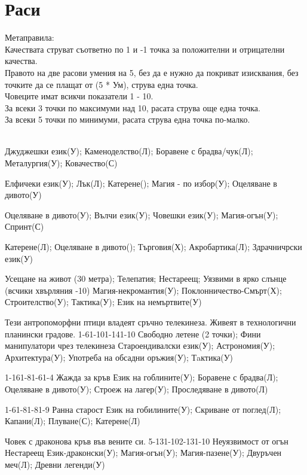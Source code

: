 \section{Раси}
Метаправила:  \\
Качествата струват съответно по 1 и -1 точка за положителни и отрицателни качества.  \\
Правото на две расови умения на 5, без да е нужно да покриват изисквания, без точките да се плащат от (5 * Ум), струва една точка.  \\
Човеците имат всикчи показатели 1 - 10.  \\
За всеки 3 точки по максимуми над 10, расата струва още една точка.  \\
За всеки 5 точки по минимуми, расата струва една точка по-малко.  \\
\\
\begin{multicols}{2}

{
Джуджешки език(У);
Каменоделство(Л);
Боравене с брадва/чук(Л);
Металургия(У);
Ковачество(С)
}

{
Елфичеки език(У);
Лък(Л);
Катерене();
Магия - по избор(У);
Оцеляване в дивото(У)
}

{
Оцеляване в дивото(У);
Вълчи език(У);
Човешки език(У);
Магия-огън(У);
Спринт(С)
}

{
Катерене(Л);
Оцеляване в дивото();
Търговия(Х);
Акробартика(Л);
Здрачничрски език(У)
}

{
Усещане на живот (30 метра);
Телепатия;
Нестареещ;
Уязвими в ярко слънце (всчики хвърляния -10)
}
{
Магия-некромантия(У);
Поклонничество-Смърт(Х);
Строителство(У);
Тактика(У);
Език на немъртвите(У)
}

{Тези антропоморфни птици владеят сръчно телекинеза. Живеят в технологични планински градове.}
{1-6}{1-10}{1-14}{1-10}
{
Свободно летене (2 точки);
Фини манипулатори чрез телекинеза
}
{
Староендивалски език(У);
Астрономия(У);
Архитектура(У);
Употреба на обсадни оръжия(У);
Тaктика(У)
}

{}
{1-16}{1-8}{1-6}{1-4}
{
Жажда за кръв
}
{
Език на гоблините(У);
Боравене с брадва(Л);
Оцеляване в дивото(У);
Строеж на лагер(У);
Проследяване в дивото(Л)
}

{}
{1-6}{1-8}{1-8}{1-9}
{
Ранна старост
}
{
Език на гобилините(У);
Скриване от поглед(Л);
Капани(Л);
Плуване(С);
Катерене(Л)
}

{Човек с драконова кръв във вените си.}
{5-13}{1-10}{2-13}{1-10}
{
Неуязвимост от огън
Нестареещ
}
{
Език-драконски(У);
Магия-огън(У);
Магия-пазене(У);
Двуръчен меч(Л);
Древни легенди(У)
}

\end{multicols}
